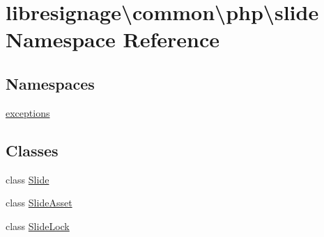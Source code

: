 \hypertarget{namespacelibresignage_1_1common_1_1php_1_1slide}{}\section{libresignage\textbackslash{}common\textbackslash{}php\textbackslash{}slide Namespace Reference}
\label{namespacelibresignage_1_1common_1_1php_1_1slide}
\subsection*{Namespaces}
\begin{DoxyCompactItemize}
\item 
 \hyperlink{namespacelibresignage_1_1common_1_1php_1_1slide_1_1exceptions}{exceptions}
\end{DoxyCompactItemize}
\subsection*{Classes}
\begin{DoxyCompactItemize}
\item 
class \hyperlink{classlibresignage_1_1common_1_1php_1_1slide_1_1Slide}{Slide}
\item 
class \hyperlink{classlibresignage_1_1common_1_1php_1_1slide_1_1SlideAsset}{Slide\+Asset}
\item 
class \hyperlink{classlibresignage_1_1common_1_1php_1_1slide_1_1SlideLock}{Slide\+Lock}
\end{DoxyCompactItemize}
